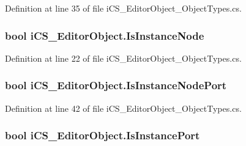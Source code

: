 Definition at line 35 of file i\+C\+S\+\_\+\+Editor\+Object\+\_\+\+Object\+Types.\+cs.

\hypertarget{classi_c_s___editor_object_a166f1688cda25ee1885a91107b847bf8}{
\subsubsection[{Is\+Instance\+Node}]{\setlength{\rightskip}{0pt plus 5cm}bool i\+C\+S\+\_\+\+Editor\+Object.\+Is\+Instance\+Node\hspace{0.3cm}{\ttfamily [get]}}}\label{classi_c_s___editor_object_a166f1688cda25ee1885a91107b847bf8}


Definition at line 22 of file i\+C\+S\+\_\+\+Editor\+Object\+\_\+\+Object\+Types.\+cs.

\hypertarget{classi_c_s___editor_object_afc882dff00d771494cedf5a456adda54}{
\subsubsection[{Is\+Instance\+Node\+Port}]{\setlength{\rightskip}{0pt plus 5cm}bool i\+C\+S\+\_\+\+Editor\+Object.\+Is\+Instance\+Node\+Port\hspace{0.3cm}{\ttfamily [get]}}}\label{classi_c_s___editor_object_afc882dff00d771494cedf5a456adda54}


Definition at line 42 of file i\+C\+S\+\_\+\+Editor\+Object\+\_\+\+Object\+Types.\+cs.

\hypertarget{classi_c_s___editor_object_ad11b94908309182e476ca1b9ddea4363}{
\subsubsection[{Is\+Instance\+Port}]{\setlength{\rightskip}{0pt plus 5cm}bool i\+C\+S\+\_\+\+Editor\+Object.\+Is\+Instance\+Port\hspace{0.3cm}{\ttfamily [get]}}}\label{classi_c_s___editor_object_ad11b94908309182e476ca1b9ddea4363}


